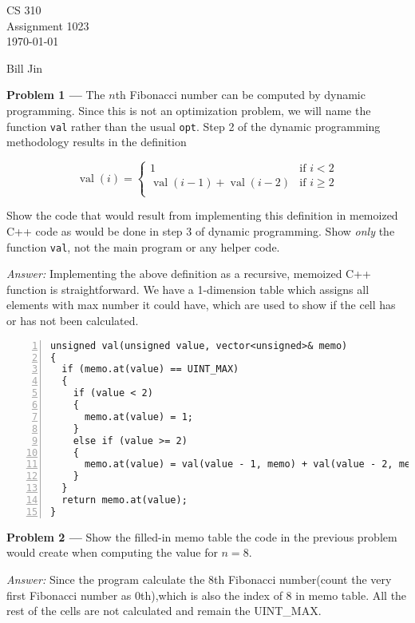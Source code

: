 \documentclass[11pt]{article}
\newcommand{\name}{Bill Jin} %
\DeclareMathOperator{\val}{val}
\newcommand{\problem}[1]{\vspace*{2ex}\textbf{Problem #1 ---} }
\newcommand{\answer}{\emph{Answer: } }
\begin{document}
\thispagestyle{empty}

\begin{center}
{\large CS 310}\\
Assignment 1023\\
\today
\end{center}

\begin{flushright}
\name{} %
\end{flushright}

\problem{1} The $n$th Fibonacci number can be computed by dynamic
programming. Since this is not an optimization problem, we will name
the function \verb.val. rather than the usual \verb.opt.. Step 2 of
the dynamic programming methodology results in the definition

\[
\val(i) = \begin{cases}
  1 & \text{if } i < 2\\
  \val(i-1) + \val(i-2) & \text{if } i \geq 2\\
\end{cases}
\]

Show the code that would result from implementing this definition in
memoized C++ code as would be done in step 3 of dynamic programming.
Show \emph{only} the function \verb.val., not the main program or any
helper code.

\answer Implementing the above definition as a recursive,
memoized C++ function is straightforward. We have a 1-dimension table which  assigns all elements with max number it could have, which are used to show if the cell has or has not been calculated. 

\begin{Verbatim}[numbers=left, xleftmargin=5mm]
unsigned val(unsigned value, vector<unsigned>& memo)
{
  if (memo.at(value) == UINT_MAX)
  {
    if (value < 2)
    {
      memo.at(value) = 1;
    }
    else if (value >= 2)
    {
      memo.at(value) = val(value - 1, memo) + val(value - 2, memo);
    }
  }
  return memo.at(value);
}
\end{Verbatim}

\problem{2} Show the filled-in memo table the code in the previous
problem would create when computing the value for $n = 8$.

\answer
Since the program calculate the 8th Fibonacci number(count the very first Fibonacci number as 0th),which is also the index of 8 in memo table. All the rest of the cells are not calculated and remain the UINT\_MAX.
\end{document}
